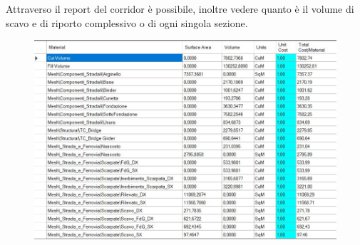 Attraverso il report del corridor è possibile, inoltre vedere quanto è il volume di scavo e di riporto complessivo o di ogni singola sezione.

\begin{figure}[H]
	\centering
	\includegraphics[width=\linewidth]{Figures/Corridor report}
    \label{fig:Corridor report}
\end{figure}



